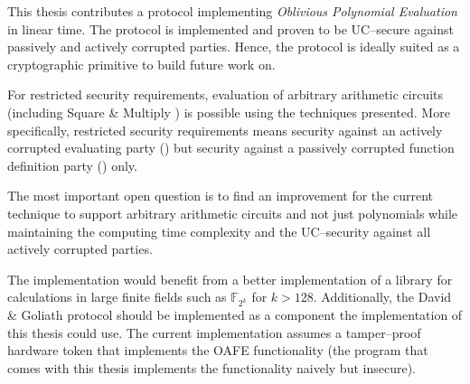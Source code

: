 \label{sec:conclusion}

This thesis contributes a protocol implementing \emph{Oblivious Polynomial
Evaluation} in linear time. The protocol is implemented and proven to be
UC--secure \cite{canetti05} against passively and actively corrupted parties.
Hence, the protocol is ideally suited as a cryptographic primitive to
build future work on.

For restricted security requirements, evaluation of arbitrary arithmetic
circuits (including Square \& Multiply \cite{knuth81}) is possible using the
techniques presented. More specifically, restricted security requirements means
security against an actively corrupted evaluating party (\JWpTwo{}) but security
against a passively corrupted function definition party (\JWpOne{}) only.


%
%
\label{sec:outlook}

The most important open question is to find an improvement for the current
technique to support arbitrary arithmetic circuits and not just polynomials
while maintaining the computing time complexity and the UC--security against all
actively corrupted parties.

The implementation would benefit from a better implementation of a library for
calculations in large finite fields such as $\mathbb{F}_{2^{k}}$ for $k > 128$.
Additionally, the David \& Goliath protocol \cite{davidgoliath} should be
implemented as a component the implementation of this thesis could use. The
current implementation assumes a tamper--proof hardware token that implements
the OAFE functionality (the program \JWBtoken{} that comes with this thesis
implements the functionality naively but insecure).

